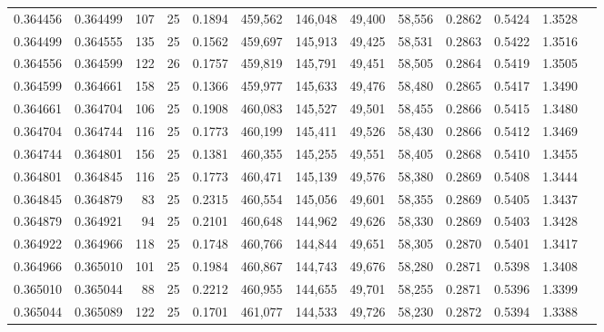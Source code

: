\begin{tabular}{rrrrrrrrrrrrr}
0.364456 & 0.364499 &   107 &  25 &                                     0.1894 & 459,562 & 146,048 &  49,400 &  58,556 & 0.2862 & 0.5424 & 1.3528 \\
0.364499 & 0.364555 &   135 &  25 &                                     0.1562 & 459,697 & 145,913 &  49,425 &  58,531 & 0.2863 & 0.5422 & 1.3516 \\
0.364556 & 0.364599 &   122 &  26 &                                     0.1757 & 459,819 & 145,791 &  49,451 &  58,505 & 0.2864 & 0.5419 & 1.3505 \\
0.364599 & 0.364661 &   158 &  25 &                                     0.1366 & 459,977 & 145,633 &  49,476 &  58,480 & 0.2865 & 0.5417 & 1.3490 \\
0.364661 & 0.364704 &   106 &  25 &                                     0.1908 & 460,083 & 145,527 &  49,501 &  58,455 & 0.2866 & 0.5415 & 1.3480 \\
0.364704 & 0.364744 &   116 &  25 &                                     0.1773 & 460,199 & 145,411 &  49,526 &  58,430 & 0.2866 & 0.5412 & 1.3469 \\
0.364744 & 0.364801 &   156 &  25 &                                     0.1381 & 460,355 & 145,255 &  49,551 &  58,405 & 0.2868 & 0.5410 & 1.3455 \\
0.364801 & 0.364845 &   116 &  25 &                                     0.1773 & 460,471 & 145,139 &  49,576 &  58,380 & 0.2869 & 0.5408 & 1.3444 \\
0.364845 & 0.364879 &    83 &  25 &                                     0.2315 & 460,554 & 145,056 &  49,601 &  58,355 & 0.2869 & 0.5405 & 1.3437 \\
0.364879 & 0.364921 &    94 &  25 &                                     0.2101 & 460,648 & 144,962 &  49,626 &  58,330 & 0.2869 & 0.5403 & 1.3428 \\
0.364922 & 0.364966 &   118 &  25 &                                     0.1748 & 460,766 & 144,844 &  49,651 &  58,305 & 0.2870 & 0.5401 & 1.3417 \\
0.364966 & 0.365010 &   101 &  25 &                                     0.1984 & 460,867 & 144,743 &  49,676 &  58,280 & 0.2871 & 0.5398 & 1.3408 \\
0.365010 & 0.365044 &    88 &  25 &                                     0.2212 & 460,955 & 144,655 &  49,701 &  58,255 & 0.2871 & 0.5396 & 1.3399 \\
0.365044 & 0.365089 &   122 &  25 &                                     0.1701 & 461,077 & 144,533 &  49,726 &  58,230 & 0.2872 & 0.5394 & 1.3388 \\

\end{tabular}

